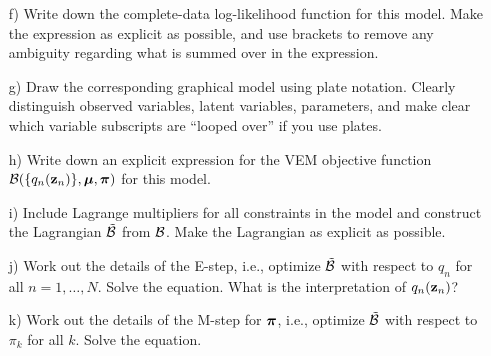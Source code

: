 \documentclass{amsmlaj}
\begin{document}
\begin{problem}
\begin{itemize}
  \item[f)] Write down the complete-data log-likelihood function for this model. Make the expression as explicit as possible, and use brackets to remove any ambiguity regarding what is summed over in the expression. 
  \item[g)] Draw the corresponding graphical model using plate notation. Clearly distinguish observed variables, latent variables, parameters, and make clear which variable subscripts are ``looped over'' if you use plates.
  \item[h)] Write down an explicit expression for the VEM objective function ${\mathcal{B}}(\{q_n(\bm{\mathbf{z}}_n)\},\bm{\mathbf{\mu}},\bm{\mathbf{\pi}})$ for this model.
  \item[i)] Include Lagrange multipliers for all constraints in the model and construct the Lagrangian ${\mathcal{\tilde{B}}}$ from ${\mathcal{B}}$. Make the Lagrangian as explicit as possible. 
  \item[j)] Work out the details of the E-step, i.e., optimize ${\mathcal{\tilde{B}}}$ with respect to $q_n$ for all $n=1,\dots,N$. Solve the equation. What is the interpretation of $q_n(\bm{\mathbf{z}}_n)$? 
  \item[k)] Work out the details of the M-step for $\bm{\mathbf{\pi}}$, i.e., optimize ${\mathcal{\tilde{B}}}$ with respect to $\pi_k$ for all $k$. Solve the equation. 
  \end{itemize}


\end{problem}
\end{document}
